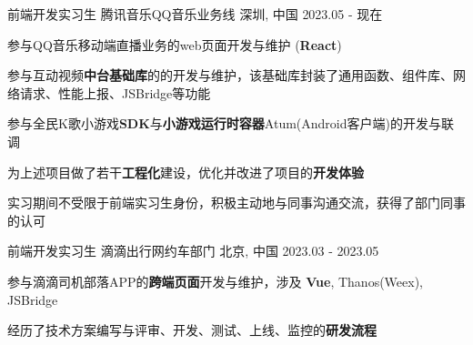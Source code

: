 

\begin{cventries}
    \cventry
    {前端开发实习生} %
    {腾讯音乐\hspace{2mm}QQ音乐业务线} %
    {深圳, 中国} %
    {2023.05 - 现在} %
    {
        \begin{cvitems} %
            \item {参与QQ音乐移动端直播业务的web页面开发与维护 (\textbf{React})}
            \item {参与互动视频\textbf{中台基础库}的的开发与维护，该基础库封装了通用函数、组件库、网络请求、性能上报、JSBridge等功能}
            \item {参与全民K歌小游戏\textbf{SDK}与\textbf{小游戏运行时容器}Atum(Android客户端)的开发与联调}
            \item {为上述项目做了若干\textbf{工程化}建设，优化并改进了项目的\textbf{开发体验}}
            \item {实习期间不受限于前端实习生身份，积极主动地与同事沟通交流，获得了部门同事的认可}
        \end{cvitems}
    }

    \cventry
    {前端开发实习生} %
    {滴滴出行\hspace{2mm}网约车部门} %
    {北京, 中国} %
    {2023.03 - 2023.05} %
    {
        \begin{cvitems} %
            \item {参与滴滴司机部落APP的\textbf{跨端页面}开发与维护，涉及 \textbf{Vue}, Thanos(Weex), JSBridge }
            \item {经历了技术方案编写与评审、开发、测试、上线、监控的\textbf{研发流程}}
        \end{cvitems}
    }
\end{cventries}
